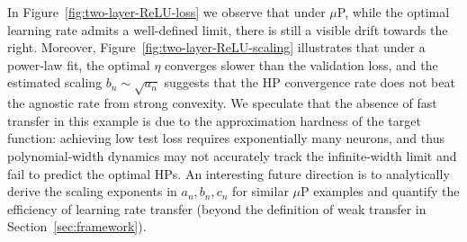 In Figure~\ref{fig:two-layer-ReLU-loss} we observe that under $\mu$P, while the optimal learning rate admits a well-defined limit, there is still a visible drift towards the right. Moreover, Figure~\ref{fig:two-layer-ReLU-scaling} illustrates that under a power-law fit, the optimal $\eta$ converges slower than the validation loss, and the estimated scaling $b_n\sim \sqrt{a_n}$ suggests that the HP convergence rate does not beat the agnostic rate from strong convexity. We speculate that the absence of fast transfer in this example is due to the approximation hardness of the target function: achieving low test loss requires exponentially many neurons, and thus polynomial-width dynamics may not accurately track the infinite-width limit and fail to predict the optimal HPs. 
An interesting future direction is to analytically derive the scaling exponents in $a_n,b_n,c_n$ for similar $\mu$P examples and quantify the efficiency of learning rate transfer 
(beyond the definition of weak transfer in Section~\ref{sec:framework}). 

